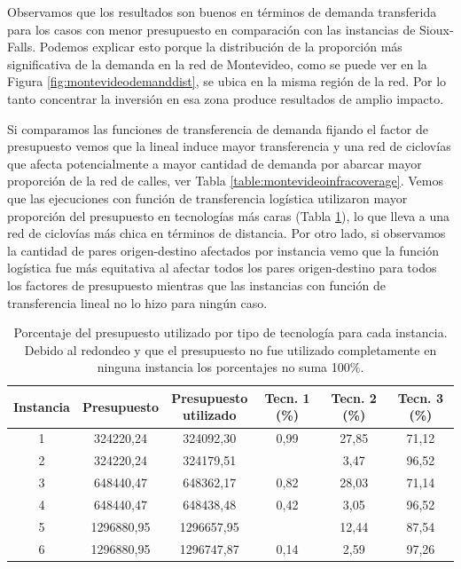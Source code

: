 \documentclass{article}
\begin{document}
  Observamos que los resultados son buenos en términos de demanda transferida para los casos con menor presupuesto en comparación con las instancias de Sioux-Falls. Podemos explicar esto porque la distribución de la proporción más significativa de la demanda en la red de Montevideo, como se puede ver en la Figura \ref{fig:montevideodemanddist}, se ubica en la misma región de la red. Por lo tanto concentrar la inversión en esa zona produce resultados de amplio impacto.

  Si comparamos las funciones de transferencia de demanda fijando el factor de presupuesto vemos que la lineal induce mayor transferencia y una red de ciclovías que afecta potencialmente a mayor cantidad de demanda por abarcar mayor proporción de la red de calles, ver Tabla \ref{table:montevideoinfracoverage}. Vemos que las ejecuciones con función de transferencia logística utilizaron mayor proporción del presupuesto en tecnologías más caras (Tabla \ref{table:montevideobudgetusage}), lo que lleva a una red de ciclovías más chica en términos de distancia. Por otro lado, si observamos la cantidad de pares origen-destino afectados por instancia vemo que la función logística fue más equitativa al afectar todos los pares origen-destino para todos los factores de presupuesto mientras que las instancias con función de transferencia lineal no lo hizo para ningún caso.

  \begin{table}[h!]
    \centering
    \begin{adjustbox}{width=1.2\textwidth,center=\textwidth}
      \begin{tabular}{cccccc}
        \toprule
          Instancia & Presupuesto & \shortstack{Presupuesto \\ utilizado} & Tecn. 1 (\%) & Tecn. 2 (\%) & Tecn. 3 (\%) \\
        \midrule
          1 & 324220,24 & 324092,30 & 0,99 & 27,85 & 71,12 \\
          2 & 324220,24 & 324179,51 &  & 3,47 & 96,52 \\
          3 & 648440,47 & 648362,17 & 0,82 & 28,03 & 71,14 \\
          4 & 648440,47 & 648438,48 & 0,42 & 3,05 & 96,52 \\
          5 & 1296880,95 & 1296657,95 &  & 12,44 & 87,54 \\
          6 & 1296880,95 & 1296747,87 & 0,14 & 2,59 & 97,26 \\
        \bottomrule
      \end{tabular}
    \end{adjustbox}
    \caption{Porcentaje del presupuesto utilizado por tipo de tecnología para cada instancia. Debido al redondeo y que el presupuesto no fue utilizado completamente en ninguna instancia los porcentajes no suma 100\%.}\label{table:montevideobudgetusage}
  \end{table}
\end{document}
